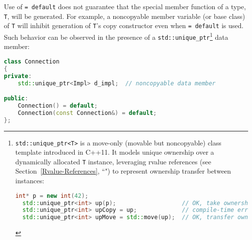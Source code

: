 Use of \texttt{=}~\texttt{default} does not guarantee that the special
member function of a type, \texttt{T}, will be generated. For example, a
noncopyable member variable (or base class) of \texttt{T} will inhibit
generation of \texttt{T}'s copy constructor even when
\texttt{=}~\texttt{default} is used. Such behavior can be observed in
the presence of a \texttt{std::unique\_ptr}{\cprotect\footnote{\texttt{std::unique\_ptr<T>}
is a move-only (movable but noncopyable) class template introduced in
C++11. It models unique ownership over a dynamically allocated
  \texttt{T} instance, leveraging rvalue references (see Section~\ref{Rvalue-References}, ``") to represent ownership transfer between instances:

  \begin{lstlisting}[language=C++, basicstyle={\ttfamily\footnotesize}]
  int* p = new int(42);
  std::unique_ptr<int> up(p);                   // OK, take ownership of (ù{\codeincomments{p}}ù).
  std::unique_ptr<int> upCopy = up;             // compile-time error
  std::unique_ptr<int> upMove = std::move(up);  // OK, transfer ownership.
  \end{lstlisting}
      }} data member:

\begin{lstlisting}[language=C++]
class Connection
{
private:
    std::unique_ptr<Impl> d_impl;  // noncopyable data member

public:
    Connection() = default;
    Connection(const Connection&) = default;
};
\end{lstlisting}

